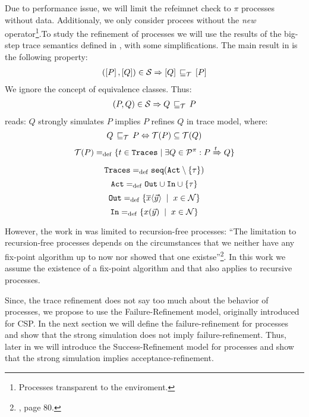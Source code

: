 Due to performance issue, we will limit the refeimnet check to $\pi$ processes without data. Additionaly, we only consider procees without the \textit{new} operator\footnote{Processes transparent to the enviroment.}.To study the refinement of \picalc{} processes we will use the results of the big-step trace semantics defined in \cite{gieseking}, with some simplifications. 
The main result in \cite{gieseking} is the following property:
\begin{align}
    (\ec{P},\ec{Q})\in{}\simu \Rightarrow \ec{Q} \refi \ec{P} \label{property1}
\end{align}
We ignore the concept of equivalence classes. Thus:
\begin{align}
    (P,Q)\in{}\simu \Rightarrow Q \refi P
\label{property2}
\end{align}
 reads: $Q$ strongly simulates $P$ implies $P$ refines $Q$ in trace model, where:
\[Q\refi P \Leftrightarrow \Traces[P]\subseteq\Traces[Q]\]
\[\Traces[P] \define \{t\in \tr \mid \exists Q\in\procs: P \bigstep{t} Q\}\]
\[\tr \define \seqset{\actions\setminus\set{\tau}}\]
\[\actions\define\outA\cup\inA\cup\set{\tau}\]
\[\outA\define\set[x\in\names]{\out{x}{\vec{y}}}\]
\[\inA\define\set[x\in\names]{\inp{x}{\vec{y}}}\]

However, the work in \cite{gieseking} was limited to recursion-free processes: ``The limitation to recursion-free processes depends on the circumstances that we neither have any fix-point algorithm up to now nor showed that one existse''\footnote{\cite{gieseking}, page $80$.}. In this work we assume the existence of a fix-point algorithm and that  also applies to recursive processes.


Since, the trace refinement does not say too much about the behavior of processes, we propose to use the Failure-Refinement model, originally introduced for CSP. In the next section we will define the failure-refinement for \picalc{} processes and show that the strong simulation does not imply failure-refinement. Thus, later in  we will introduce the Success-Refinement model for \picalc{} processes and show that the strong simulation implies acceptance-refinement.